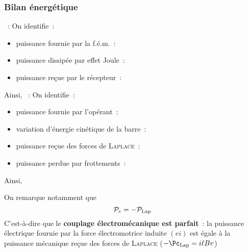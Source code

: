 \documentclass[../main/main.tex]{subfiles}
\begin{document}
\subsubsection{Bilan énergétique}
\label{sssec:rlplgene_bilanrj}
\begin{itemize}[label=$\diamond$, leftmargin=10pt]
	~:  On identifie~:
	\begin{itemize}[label=$\triangleright$, leftmargin=20pt]
		\item puissance fournie par la f.é.m.~: 
		\item puissance dissipée par effet Joule~: 
		\item puissance reçue par le récepteur~: 
	\end{itemize}
	Ainsi,
	~:  On identifie~:
	\begin{itemize}[label=$\triangleright$, leftmargin=20pt]
		\item puissance fournie par l'opérant~: 
		\item variation d'énergie cinétique de la barre~: 
		\item puissance reçue des forces de \textsc{Laplace}~: 
		\item puissance perdue par frottements~: 
	\end{itemize}
	Ainsi,
\end{itemize}
On remarque notamment que
\[
	\mathcal{P}_e = -\mathcal{P}_{\rm Lap}
\]
C'est-à-dire que le \textbf{couplage électromécanique est parfait}~: la
puissance électrique fournie par la force électromotrice induite $(ei)$ est
égale à la puissance mécanique reçue des forces de \textsc{Laplace} ($- \Pc_{\rm
	Lap} = i \ell Bv$)
\end{document}
